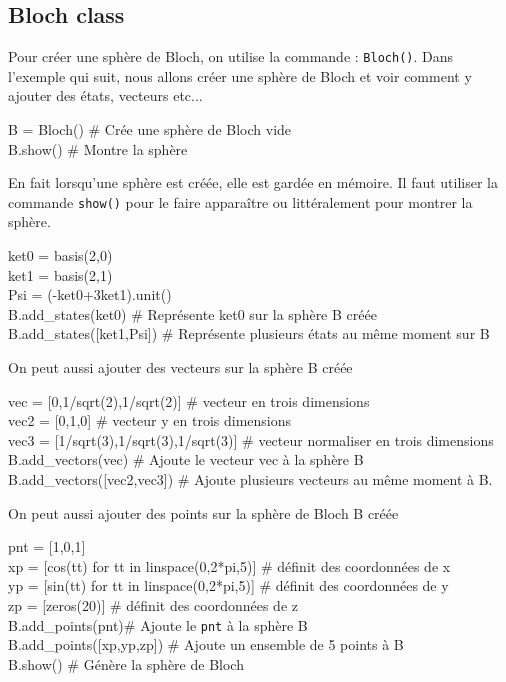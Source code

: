 \subsection{Bloch class}

Pour créer une sphère de Bloch, on utilise la commande : \texttt{Bloch()}. Dans l'exemple qui suit, nous allons créer une sphère de Bloch et voir comment y ajouter des états, vecteurs etc...\\
\begin{tt}
B = Bloch() \# Crée une sphère de Bloch vide\\
B.show() \# Montre la sphère\\
\end{tt}
En fait lorsqu'une sphère est créée, elle est gardée en mémoire. Il faut utiliser la commande \texttt{show()} pour le faire apparaître ou littéralement pour montrer la sphère.\\
\begin{tt}
ket0 = basis(2,0)\\
ket1 = basis(2,1)\\
Psi = (-ket0+3ket1).unit()\\
B.add\_states(ket0) \# Représente ket0 sur la sphère B créée\\
B.add\_states([ket1,Psi]) \# Représente plusieurs états au même moment sur B\\
\end{tt}
On peut aussi ajouter des vecteurs sur la sphère B créée \\
\begin{tt}
vec = [0,1/sqrt(2),1/sqrt(2)] \# vecteur en trois dimensions\\
vec2 = [0,1,0] \# vecteur y en trois dimensions\\
vec3 = [1/sqrt(3),1/sqrt(3),1/sqrt(3)] \# vecteur normaliser en trois dimensions\\
B.add\_vectors(vec) \# Ajoute le vecteur vec à la sphère B\\
B.add\_vectors([vec2,vec3]) \# Ajoute plusieurs vecteurs au même moment à B.\\
\end{tt}
On peut aussi ajouter des points sur la sphère de Bloch B créée\\
\begin{tt}
pnt = [1,0,1] \\
xp = [cos(tt) for tt in linspace(0,2*pi,5)] \# définit des coordonnées de x\\
yp = [sin(tt) for tt in linspace(0,2*pi,5)] \# définit des coordonnées de y\\
zp = [zeros(20)] \# définit des coordonnées de z\\
B.add\_points(pnt)\# Ajoute le \texttt{pnt} à la sphère B\\
B.add\_points([xp,yp,zp]) \# Ajoute un ensemble de 5 points à B\\
B.show() \# Génère la sphère de Bloch\\
\end{tt}

